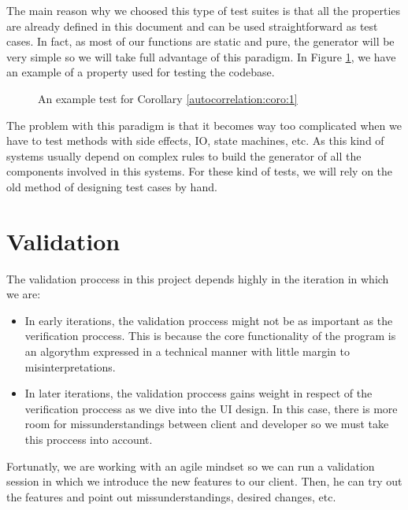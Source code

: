     The main reason why we choosed this type of test suites is that all the
    properties are already defined in this document and can be used
    straightforward as test cases. In fact, as most of our functions
    are static and pure, the generator will be very simple so we will take full
    advantage of this paradigm. In Figure \ref{test_example}, we have an example
    of a property used for testing the codebase.\\

    \begin{figure}[ht!]
      \caption{An example test for Corollary \ref{autocorrelation:coro:1}}
      \label{test_example}
    \end{figure}

    The problem with this paradigm is that it becomes way too complicated when
    we have to test methods with side effects, IO, state machines, etc. As this
    kind of systems usually depend on complex rules to build the generator of
    all the components involved in this systems. For these kind of tests, we
    will rely on the old method of designing test cases by hand.\\

\section{Validation}

The validation proccess in this project depends highly in the iteration in which
we are:

\begin{itemize}
  \item In early iterations, the validation proccess might not be as important
  as the verification proccess. This is because the core functionality of the
  program is an algorythm expressed in a technical manner with little margin
  to misinterpretations.
  \item In later iterations, the validation proccess gains weight in respect of
  the verification proccess as we dive into the UI design. In this case, there
  is more room for missunderstandings between client and developer so we must
  take this proccess into account.
\end{itemize}

Fortunatly, we are working with an agile mindset so we can run a validation
session in which we introduce the new features to our client. Then, he can
try out the features and point out missunderstandings, desired changes, etc.\\
